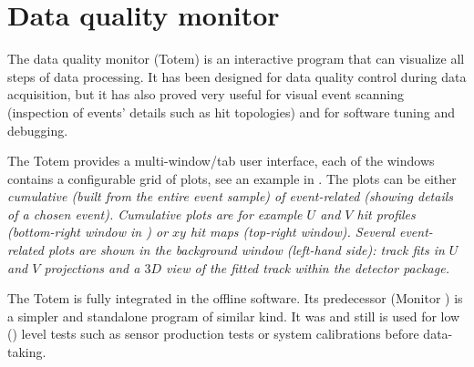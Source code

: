 


\section[dqm]{Data quality monitor}

The data quality monitor (Totem) is an interactive program that can visualize all steps of data processing. It has been designed for data quality control during data acquisition, but it has also proved very useful for visual event scanning (inspection of events' details such as hit topologies) and for software tuning and debugging.


The Totem  provides a multi-window/tab user interface, each of the windows contains a configurable grid of plots, see an example in . The plots can be either \em{cumulative} (built from the entire event sample) of \em{event-related} (showing details of a chosen event). Cumulative plots are for example $U$ and $V$ hit profiles (bottom-right window in ) or $xy$ hit maps (top-right window). Several event-related plots are shown in the background window (left-hand side): track fits in $U$ and $V$ projections and a $3D$ view of the fitted track within the detector package.

The Totem is fully integrated in the  offline software. Its predecessor (Monitor ) is a simpler and standalone program of similar kind. It was and still is used for low () level tests such as  sensor production tests or system calibrations before data-taking.
